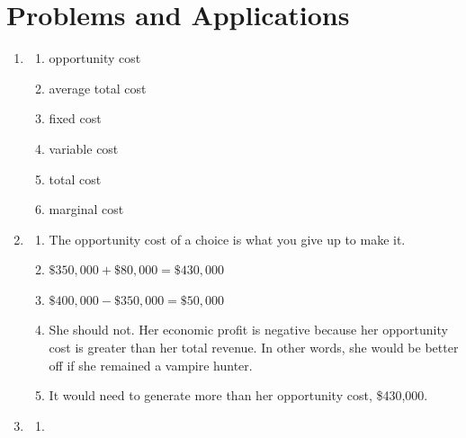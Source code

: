 \documentclass{article}
\begin{document}
\section*{Problems and Applications}

\begin{enumerate}

\item

	\begin{enumerate}
	
	\item opportunity cost
	
	\item average total cost
	
	\item fixed cost
	
	\item variable cost
	
	\item total cost
	
	\item marginal cost
	
	\end{enumerate}
	
\item 

	\begin{enumerate}
	
	\item The opportunity cost of a choice is what you give up to make it.
	
	\item $\$350,000 + \$80,000 = \$430,000$
	
	\item $\$400,000 - \$350,000 = \$50,000$
	
	\item She should not. Her economic profit is negative because her opportunity cost is greater than her total revenue. In other words, she would be better off if she remained a vampire hunter. 
	
	\item It would need to generate more than her opportunity cost, \$430,000. 
	
	\end{enumerate}
	
\item

	\begin{enumerate}
	
	\item \phantom{x}
	

\end{enumerate}
\end{enumerate}
\end{document}
